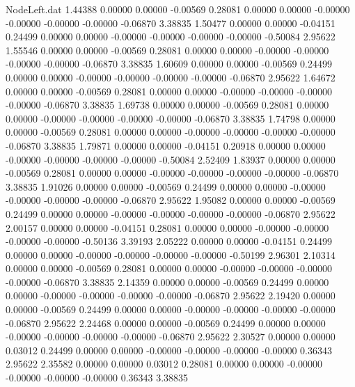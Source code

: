 \begin{filecontents}{NodeLeft.dat}
   1.44388    0.00000    0.00000    -0.00569    0.28081    0.00000    0.00000   -0.00000   -0.00000   -0.00000   -0.00000   -0.06870    3.38835
   1.50477    0.00000    0.00000    -0.04151    0.24499    0.00000    0.00000   -0.00000   -0.00000   -0.00000   -0.00000   -0.50084    2.95622
   1.55546    0.00000    0.00000    -0.00569    0.28081    0.00000    0.00000   -0.00000   -0.00000   -0.00000   -0.00000   -0.06870    3.38835
   1.60609    0.00000    0.00000    -0.00569    0.24499    0.00000    0.00000   -0.00000   -0.00000   -0.00000   -0.00000   -0.06870    2.95622
   1.64672    0.00000    0.00000    -0.00569    0.28081    0.00000    0.00000   -0.00000   -0.00000   -0.00000   -0.00000   -0.06870    3.38835
   1.69738    0.00000    0.00000    -0.00569    0.28081    0.00000    0.00000   -0.00000   -0.00000   -0.00000   -0.00000   -0.06870    3.38835
   1.74798    0.00000    0.00000    -0.00569    0.28081    0.00000    0.00000   -0.00000   -0.00000   -0.00000   -0.00000   -0.06870    3.38835
   1.79871    0.00000    0.00000    -0.04151    0.20918    0.00000    0.00000   -0.00000   -0.00000   -0.00000   -0.00000   -0.50084    2.52409
   1.83937    0.00000    0.00000    -0.00569    0.28081    0.00000    0.00000   -0.00000   -0.00000   -0.00000   -0.00000   -0.06870    3.38835
   1.91026    0.00000    0.00000    -0.00569    0.24499    0.00000    0.00000   -0.00000   -0.00000   -0.00000   -0.00000   -0.06870    2.95622
   1.95082    0.00000    0.00000    -0.00569    0.24499    0.00000    0.00000   -0.00000   -0.00000   -0.00000   -0.00000   -0.06870    2.95622
   2.00157    0.00000    0.00000    -0.04151    0.28081    0.00000    0.00000   -0.00000   -0.00000   -0.00000   -0.00000   -0.50136    3.39193
   2.05222    0.00000    0.00000    -0.04151    0.24499    0.00000    0.00000   -0.00000   -0.00000   -0.00000   -0.00000   -0.50199    2.96301
   2.10314    0.00000    0.00000    -0.00569    0.28081    0.00000    0.00000   -0.00000   -0.00000   -0.00000   -0.00000   -0.06870    3.38835
   2.14359    0.00000    0.00000    -0.00569    0.24499    0.00000    0.00000   -0.00000   -0.00000   -0.00000   -0.00000   -0.06870    2.95622
   2.19420    0.00000    0.00000    -0.00569    0.24499    0.00000    0.00000   -0.00000   -0.00000   -0.00000   -0.00000   -0.06870    2.95622
   2.24468    0.00000    0.00000    -0.00569    0.24499    0.00000    0.00000   -0.00000   -0.00000   -0.00000   -0.00000   -0.06870    2.95622
   2.30527    0.00000    0.00000     0.03012    0.24499    0.00000    0.00000   -0.00000   -0.00000   -0.00000   -0.00000    0.36343    2.95622
   2.35582    0.00000    0.00000     0.03012    0.28081    0.00000    0.00000   -0.00000   -0.00000   -0.00000   -0.00000    0.36343    3.38835

\end{filecontents}
